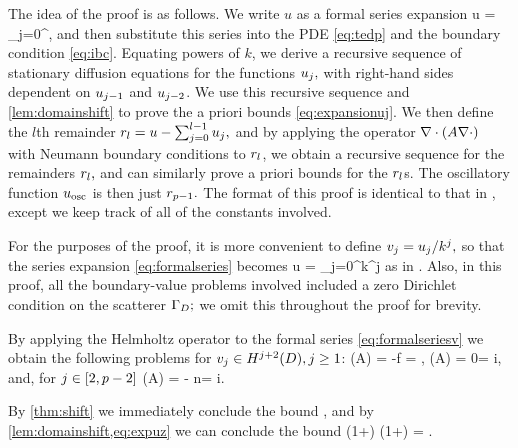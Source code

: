 The idea of the proof is as follows. We write $u$ as a formal series expansion
\beq\label{eq:formalseries}
u = \sum_{j=0}^\infty \usj,
\eeq
and then substitute this series into the PDE \cref{eq:tedp} and the boundary condition \eqref{eq:ibc}. Equating powers of $k$, we derive a recursive sequence of stationary diffusion equations for the functions $u_{j},$ with right-hand sides dependent on $u_{j-1}$ and $u_{j-2}$. We use this recursive sequence and \cref{lem:domainshift} to prove the a priori bounds \cref{eq:expansionuj}. We then define the $l$th remainder $r_{l} = u - \sum_{j=0}^{l-1} u_{j},$ and by applying the operator $\grad\cdot\mleft(A\grad \cdot\mright)$ with Neumann boundary conditions to $r_{l}$, we obtain a recursive sequence for the remainders $r_{l},$ and can similarly prove a priori bounds for the $r_{l}$s. The oscillatory function $u_{\mathrm{osc}}$ is then just $r_{p-1}.$ The format of this proof is identical to that in \cite[Theorem 1]{ChNi:18a}, except we keep track of all of the constants involved.

For the purposes of the proof, it is more convenient to define $v_{j} = u_{j}/k^j,$ so that the series expansion \cref{eq:formalseries} becomes
\beq\label{eq:formalseriesv}
u = \sum_{j=0}^\infty k^j\vj
\eeq
as in \cite{ChNi:18a}. Also, in this proof, all the boundary-value problems involved included a zero Dirichlet condition on the scatterer $\Gamma_{D};$ we omit this throughout the proof for brevity.

By applying the Helmholtz operator to the formal series \eqref{eq:formalseriesv} we obtain the following problems for $\vj \in \HjptD, j \geq 1$:
\beqs
\grad \cdot \mleft(A\grad \vz\mright) = -f \quad\tand\quad \dn \vz = \gI,
\eeqs
\beqs
\grad \cdot \mleft(A\grad \vo\mright) = 0\quad\tand\quad\dn \vo = i\vz,
\eeqs
and, for $j \in \mleft[2,p-2\mright]$
\beq\label{eq:vj}
\grad \cdot \mleft(A\grad \vj\mright) = - n\vjmt\quad\tand\quad\dn \vz = i\vjmo.
\eeq

By \cref{thm:shift} we immediately conclude the bound
\beq\label{eq:expuz}
\NHtD{\vz} \leq \CAz\Cfg \leq {}\Cfg,
\eeq
and by \cref{lem:domainshift,eq:expuz} we can conclude the bound
\beqs
\NHthD{\vo} \leq \CAo \mleft(1+\CTrt\mright) \leq \max{}\mleft(1+\mright) \Cfg = \Cfg.
\eeqs


